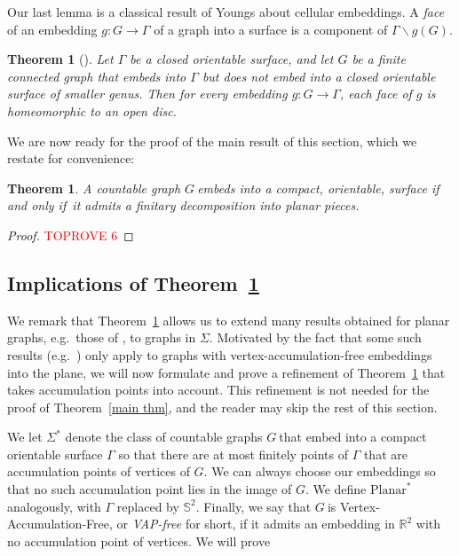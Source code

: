 \documentclass{article}
\newcommand{\pln}{\ensuremath{\mathrm{Planar}}}
\newcommand{\Sig}{\ensuremath{\Sigma}}
\newcommand{\vapf}{VAP-free}
\newcommand{\defi}[1]{{\color{darkgray}\emph{#1}}}
\newtheorem{theorem}[proposition]{Theorem}
\newcommand{\R}{\ensuremath{\mathbb R}}
\newcommand{\BS}{\ensuremath{\mathbb S}}
\newcommand{\sm}{\backslash}
\newcommand{\g}{\ensuremath{G\ }}
\newcommand{\G}{\ensuremath{G}}
\newcommand{\Tr}[1]{Theorem~\ref{#1}}
\renewcommand{\iff}{if and only if}
\begin{document}
Our last lemma is a classical result of Youngs about cellular embeddings. A \defi{face} of an embedding $g: G \to \Gamma$ of a graph into a surface is a component of $\Gamma \sm g(G)$.

\begin{theorem}[\cite{Youngs}] \label{Youngs}
Let $\Gamma$ be a closed orientable surface, and let $G$ be a finite connected graph that embeds into $\Gamma$ but does not embed into a closed orientable surface of smaller genus. Then for every embedding $g: G \to \Gamma$, each face of $g$ is homeomorphic to an open disc. 
\end{theorem}

We are now ready for the proof of the main result of this section, which we restate for convenience:
\begin{theorem}\label{thm decomp}
A countable graph \g embeds into a compact, orientable, surface \iff\ it admits a finitary decomposition into planar pieces.
\end{theorem}
\begin{proof}\textcolor{red}{TOPROVE 6}\end{proof}

\subsection{Implications of \Tr{thm decomp}} \label{sec impl}

We remark that \Tr{thm decomp} allows us to extend many results obtained for planar graphs, e.g.\ those of \cite{intersection,planarPB,UKtrans}, to graphs in \Sig. Motivated by the fact that some such results (e.g.\ \cite{HuNaUni,kozPPP}) only apply to graphs with vertex-accumulation-free embeddings into the plane, we will now formulate and prove a refinement of \Tr{thm decomp} that takes accumulation points into account. This refinement is not needed for the proof of \Tr{main thm}, and the reader may skip the rest of this section.
\medskip

We let \defi{$\Sig^*$} denote the class of countable graphs \g that embed into a compact orientable surface $\Gamma$ so that there are at most finitely points of $\Gamma$ that are accumulation points of vertices of \G. We can always choose our embeddings so that no such accumulation point lies in the image of \G. We define \defi{$\pln^*$} analogously, with $\Gamma$ replaced by $\BS^2$. Finally, we  say that \g is Vertex-Accumulation-Free, or \defi{\vapf} for short, if it admits an embedding in $\R^2$ with no accumulation point of vertices. We will prove
\end{document}
